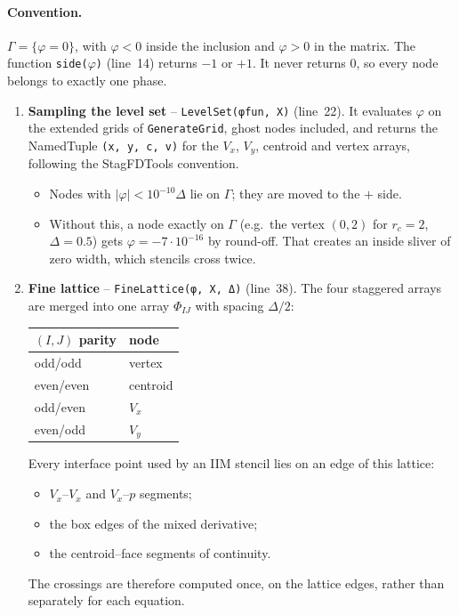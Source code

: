 \documentclass[11pt,a4paper]{article}
\newcommand{\code}[1]{\texttt{#1}}
\begin{document}
\paragraph{Convention.} $\Gamma=\{\varphi=0\}$, with $\varphi<0$ inside the inclusion and
$\varphi>0$ in the matrix. The function \code{side($\varphi$)} (line~14) returns $-1$ or $+1$.
It never returns 0, so every node belongs to exactly one phase.

\begin{enumerate}[leftmargin=*]
\item \textbf{Sampling the level set} -- \code{LevelSet(φfun, X)} (line~22).
  It evaluates $\varphi$ on the extended grids of \code{GenerateGrid}, ghost nodes included,
  and returns the NamedTuple \code{(x, y, c, v)} for the $V_x$, $V_y$, centroid and vertex
  arrays, following the StagFDTools convention.
  \begin{itemize}
    \item Nodes with $|\varphi|<10^{-10}\Delta$ lie on $\Gamma$; they are moved to the $+$ side.
    \item Without this, a node exactly on $\Gamma$ (e.g.\ the vertex $(0,2)$ for $r_c=2$,
      $\Delta=0.5$) gets $\varphi=-7\cdot10^{-16}$ by round-off. That creates an inside sliver
      of zero width, which stencils cross twice.
  \end{itemize}

\item \textbf{Fine lattice} -- \code{FineLattice(φ, X, Δ)} (line~38).
  The four staggered arrays are merged into one array $\Phi_{IJ}$ with spacing $\Delta/2$:
  \begin{center}
  \begin{tabular}{@{}ll@{}}
    \toprule
    $(I,J)$ parity & node \\
    \midrule
    odd/odd & vertex \\
    even/even & centroid \\
    odd/even & $V_x$ \\
    even/odd & $V_y$ \\
    \bottomrule
  \end{tabular}
  \end{center}
  Every interface point used by an IIM stencil lies on an edge of this lattice:
  \begin{itemize}
    \item $V_x$--$V_x$ and $V_x$--$p$ segments;
    \item the box edges of the mixed derivative;
    \item the centroid--face segments of continuity.
  \end{itemize}
  The crossings are therefore computed once, on the lattice edges, rather than separately for
  each equation.


\end{enumerate}
\end{document}
